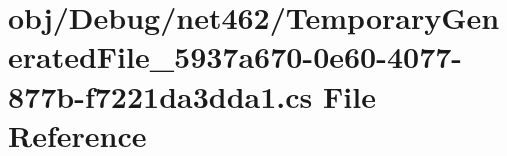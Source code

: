 \hypertarget{_debug_2net462_2_temporary_generated_file__5937a670-0e60-4077-877b-f7221da3dda1_8cs}{}\section{obj/\+Debug/net462/\+Temporary\+Generated\+File\+\_\+5937a670-\/0e60-\/4077-\/877b-\/f7221da3dda1.cs File Reference}
\label{_debug_2net462_2_temporary_generated_file__5937a670-0e60-4077-877b-f7221da3dda1_8cs}
